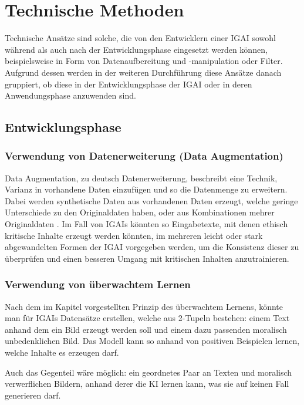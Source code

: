 \documentclass[12pt]{report}
\begin{document}
\section{Technische Methoden}

Technische Ansätze sind solche, die von den Entwicklern einer IGAI sowohl während als auch nach der Entwicklungsphase eingesetzt werden können, beispielsweise in Form von Datenaufbereitung und -manipulation oder Filter. 
Aufgrund dessen werden in der weiteren Durchführung diese Ansätze danach gruppiert, ob diese in der Entwicklungsphase der IGAI oder in deren Anwendungsphase anzuwenden sind.

\subsection{Entwicklungsphase}

\subsubsection{Verwendung von Datenerweiterung (Data Augmentation)}
Data Augmentation, zu deutsch Datenerweiterung, beschreibt eine Technik, Varianz in vorhandene Daten einzufügen und so die Datenmenge zu erweitern. Dabei werden synthetische Daten aus vorhandenen Daten erzeugt, welche geringe Unterschiede zu den Originaldaten haben, oder aus Kombinationen mehrer Originaldaten \cite[S. 2]{Shorten}.
Im Fall von IGAIs könnten so Eingabetexte, mit denen ethisch kritische Inhalte erzeugt werden könnten, im mehreren leicht oder stark abgewandelten Formen der IGAI vorgegeben werden, um die Konsistenz dieser zu überprüfen und einen besseren Umgang mit kritischen Inhalten anzutrainieren.  

\subsubsection{Verwendung von überwachtem Lernen}
Nach dem im Kapitel  vorgestellten Prinzip des überwachtem Lernens, könnte man für IGAIs Datensätze erstellen, welche aus 2-Tupeln bestehen: einem Text anhand dem ein Bild erzeugt werden soll und einem dazu passenden moralisch unbedenklichen Bild. Das Modell kann so anhand von positiven Beispielen lernen, welche Inhalte es erzeugen darf.

Auch das Gegenteil wäre möglich: ein geordnetes Paar an Texten und moralisch verwerflichen Bildern, anhand derer die KI lernen kann, was sie auf keinen Fall generieren darf.
\end{document}
